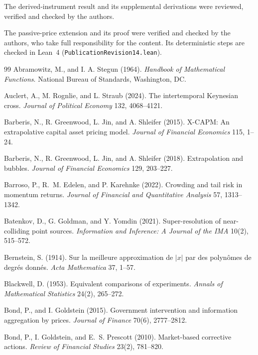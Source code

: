 \documentclass[12pt]{article}
\theoremstyle{definition}
\theoremstyle{remark}
\begin{document}
The derived-instrument result and its supplemental derivations were reviewed, verified and checked by the authors.

The passive-price extension and its proof were verified and checked by the authors, who take full responsibility for the content. Its deterministic steps are checked in Lean~4 (\nolinkurl{PublicationRevision14.lean}).

\begin{thebibliography}{99}\setlength{\itemsep}{2pt}\small
{} Abramowitz, M., and I. A. Stegun (1964). \emph{Handbook of Mathematical Functions}. National Bureau of Standards, Washington, DC.

 Auclert, A., M. Rognlie, and L. Straub (2024). The intertemporal Keynesian cross. \emph{Journal of Political Economy} 132, 4068--4121.

 Barberis, N., R. Greenwood, L. Jin, and A. Shleifer (2015). X-CAPM: An extrapolative capital asset pricing model. \emph{Journal of Financial Economics} 115, 1--24.

 Barberis, N., R. Greenwood, L. Jin, and A. Shleifer (2018). Extrapolation and bubbles. \emph{Journal of Financial Economics} 129, 203--227.

 Barroso, P., R.~M. Edelen, and P. Karehnke (2022). Crowding and tail risk in momentum returns. \emph{Journal of Financial and Quantitative Analysis} 57, 1313--1342.

 Batenkov, D., G. Goldman, and Y. Yomdin (2021). Super-resolution of near-colliding point sources. \emph{Information and Inference: A Journal of the IMA} 10(2), 515--572.

 Bernstein, S. (1914). Sur la meilleure approximation de $|x|$ par des polyn\^omes de degr\'es donn\'es. \emph{Acta Mathematica} 37, 1--57.

 Blackwell, D. (1953). Equivalent comparisons of experiments. \emph{Annals of Mathematical Statistics} 24(2), 265--272.

 Bond, P., and I. Goldstein (2015). Government intervention and information aggregation by prices. \emph{Journal of Finance} 70(6), 2777--2812.

 Bond, P., I. Goldstein, and E.~S. Prescott (2010). Market-based corrective actions. \emph{Review of Financial Studies} 23(2), 781--820.


\end{thebibliography}
\end{document}
